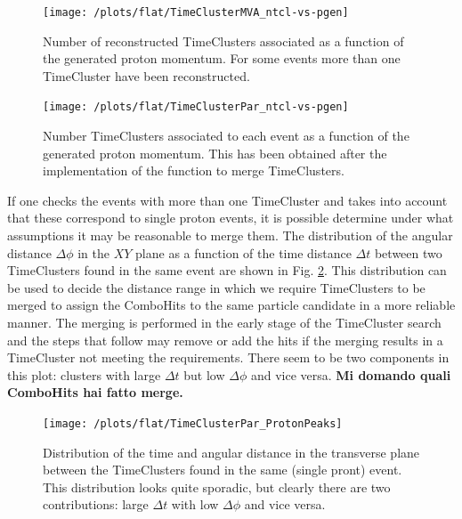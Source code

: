 \documentclass[12pt,a4paper,openright, oneside, titlepage]{book} %
\begin{document}
\begin{figure}[!htb]
    \centering
    \begin{minipage}{.49\textwidth}
		\centering
		\texttt{[image: /plots/flat/TimeClusterMVA\_ntcl-vs-pgen]}
		\caption[Number of TimeClusters per generated proton momentum]{Number of reconstructed TimeClusters associated 
		as a function of the generated proton momentum. 
		For some events more than one TimeCluster have been reconstructed.}
		\label{_TimeClusterMVA_ntcl-vs-pgen}
	\end{minipage}
	\hfill
    \begin{minipage}{0.49\textwidth}
    	\centering
    	\texttt{[image: /plots/flat/TimeClusterPar\_ntcl-vs-pgen]}
		\caption[Number of TimeClusters per generated momentum after merging]{Number TimeClusters associated to each event as a function of the generated proton momentum. 
		This has been obtained after the implementation of the function to merge TimeClusters.}
		\label{_TimeClusterPar_ntcl-vs-pgen}
	\end{minipage}
\end{figure}

\noindent If one checks the events with more than one TimeCluster and takes into account that these correspond to single proton events, it is possible determine under what assumptions it may be reasonable to merge them. 
The distribution of the angular distance $\Delta \phi$ in the $XY$ plane 
as a function of the time distance $\Delta t$ between two TimeClusters found in the same event are shown in Fig. \ref{_TimeClusterPar_ProtonPeaks}. 
This distribution can be used to decide the distance range in which we require TimeClusters to be merged 
to assign the ComboHits to the same particle candidate in a more reliable manner. 
The merging is performed in the early stage of the TimeCluster search and the steps that follow may remove or add the hits if the merging results in a TimeCluster not meeting the requirements.
There seem to be two components in this plot: clusters with large $\Delta t$ but low $\Delta \phi$ and vice versa.
{\bf{Mi domando quali ComboHits hai fatto merge.}}

\begin{figure}[h!]
\centering
\texttt{[image: /plots/flat/TimeClusterPar\_ProtonPeaks]}
\caption[TimeClusters distance in single particle event]{Distribution of the time and angular distance in the transverse plane 
between the TimeClusters found in the same (single pront) event. 
This distribution looks quite sporadic, 
but clearly there are two contributions: 
large $\Delta t$ with low $\Delta \phi$ and vice versa.}
\label{_TimeClusterPar_ProtonPeaks}
\end{figure}
\end{document}
